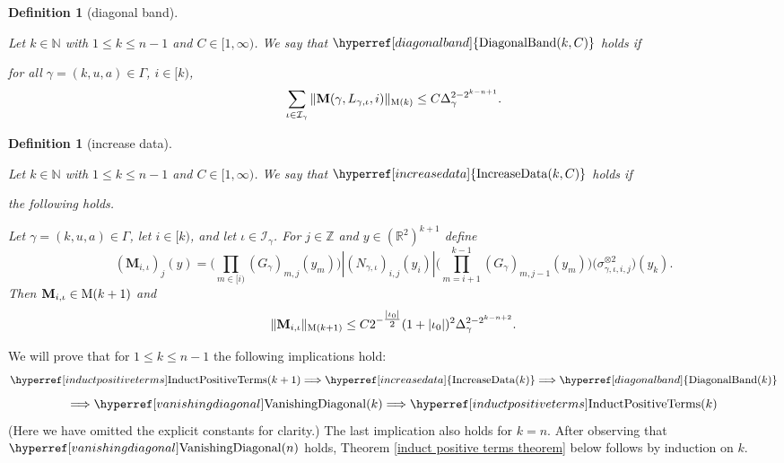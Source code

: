\documentclass[12pt,reqno]{amsart}
\theoremstyle{plain}
\newtheorem{definition}[theorem]{Definition}
\numberwithin{equation}{section}
\theoremstyle{remark}
\newcommand{\uses}[1]{}
\newcommand{\usesdefs}[1]{}
\newcommand{\lean}[1]{}
\newcommand{\N}{{\mathbb N}}
\newcommand{\M}{\mathbf{M}}
\begin{document}
\newcommand{\DiagonalBand}[1]{{\hyperref[diagonal band]{{\rm DiagonalBand}(#1)}}}
\begin{definition}[diagonal band]\label{diagonal band}\uses{}\usesdefs{geometric parameters,kernel sequences,sandwich kernel,L multiplier,summation-definition}
\lean{Auto.DiagonalBand}
Let $k\in \N$ with $1\le k\le n-1$ and $C\in [1,\infty)$.
We say that $\DiagonalBand{k,C}$ holds if

for all $\gamma=(k,u,a)\in \Gamma$, $i\in [k)$,
\begin{equation}\label{auto:L-positive-terms-sum-bound}
   \sum_{\iota\in\mathcal{I}_{\gamma}}
   \|\M(\gamma,L_{\gamma,\iota},i)\|_{{\rm M}(k)}
   \le C\Delta_\gamma^{2-2^{k-n+1}} .
\end{equation}
\end{definition}


\newcommand{\IncreaseData}[1]{{\hyperref[increase data]{{\rm IncreaseData}(#1)}}}
\begin{definition}[increase data]\label{increase data}\uses{}\usesdefs{geometric parameters,kernel sequences,2D Gaussians,L multiplier,N multiplier}
\lean{Auto.IncreaseData}
Let $k\in \N$ with $1\le k\le n-1$ and $C\in [1,\infty)$.
We say that $\IncreaseData{k,C}$ holds if

the following holds.

Let $\gamma=(k,u,a)\in \Gamma$, let $i\in [k)$, and let
$\iota\in\mathcal{I}_{\gamma}$.
For $j\in\mathbb Z$ and $y\in(\mathbb R^2)^{k+1}$ define
\begin{equation}\label{auto:increased-data-kernel}
    (\M_{i,\iota})_j(y)=
    \Big(\prod_{m\in [i)} (G_\gamma)_{m,j}(y_m)\Big)
    |(N_{\gamma,\iota})_{i,j}(y_i)|
    \Big(\prod_{m=i+1}^{k-1} (G_\gamma)_{m,j-1}(y_m)\Big)
    \bigl(\sigma_{\gamma,\iota,i,j}^{\otimes 2}\bigr)(y_{k}) .
\end{equation}
Then $\M_{i,\iota}\in {\rm M}(k+1)$ and
\begin{equation}\label{auto:increased-data-M-norm-bound}
  \|\M_{i,\iota}\|_{{\rm M}(k+1)}
  \le
  C 2^{-\tfrac{|\iota_0|}{2}}(1+|\iota_0|)^2
  \Delta_\gamma^{2-2^{k-n+2}} .
\end{equation}
\end{definition}
We will prove that for $1\le k\le n-1$ the following implications hold:
\begin{equation}\label{auto:induction-implication-chain-first} \InductPositiveTerms{k+1} \Longrightarrow \IncreaseData{k} \Longrightarrow \DiagonalBand{k} \end{equation}
\begin{equation}\label{auto:induction-implication-chain-second} \Longrightarrow \VanishingDiagonal{k} \Longrightarrow \InductPositiveTerms{k} \end{equation}
(Here we have omitted the explicit constants for clarity.)
The last implication also holds for $k=n$. After observing that $\VanishingDiagonal{n}$ holds,
Theorem \ref{induct positive terms theorem} below follows by induction on $k$.
\end{document}
